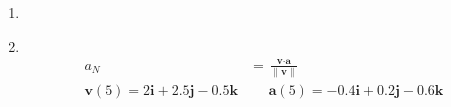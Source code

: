 \documentclass[11pt]{article}
\newcommand\Item[1][]{%
  \ifx\relax#1\relax  \item \else \item[#1] \fi
  \abovedisplayskip=0pt\abovedisplayshortskip=0pt~\vspace*{-\baselineskip}}
\begin{document}
\begin{enumerate}
\begin{enumerate}
              \Item
              \begin{align*}
                  a_{N}                                                          & = \frac{\textbf{v}{\cdot}\textbf{a}}{\| \textbf{v} \|}           \\
                  \textbf{v}(5) = 2 \textbf{i} + 2.5 \textbf{j} - 0.5 \textbf{k} &\;\;\;\;\; \textbf{a}(5) = -0.4 \textbf{i} + 0.2 \textbf{j} - 0.6 \textbf{k} \\
              \end{align*}
          \end{enumerate}
\end{enumerate}
\end{document}

